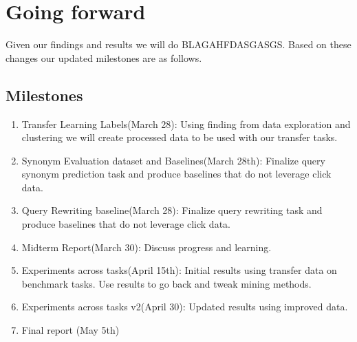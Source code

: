 \section{Going forward}

Given our findings and results we will do BLAGAHFDASGASGS. Based on these changes our updated milestones are as follows.
\subsection{Milestones}
\begin{enumerate}
    \item Transfer Learning Labels(March 28): Using finding from data exploration and clustering we will create processed data to be used with our transfer tasks.
    \item Synonym Evaluation dataset and Baselines(March 28th): Finalize query synonym prediction task and produce baselines that do not leverage click data.
    \item Query Rewriting baseline(March 28): Finalize query rewriting task and produce baselines that do not leverage click data.
    \item Midterm Report(March 30): Discuss progress and learning.
    \item Experiments across tasks(April 15th): Initial results using transfer data on benchmark tasks. Use results to go back and tweak mining methods.
    \item Experiments across tasks v2(April 30): Updated results using improved data.
    \item Final report (May 5th)
\end{enumerate}